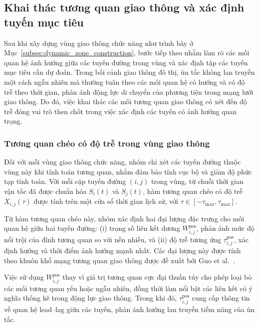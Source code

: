 \subsection{Khai thác tương quan giao thông và xác định tuyến mục tiêu}
\label{subsec:correlation_target_selection}

Sau khi xây dựng vùng giao thông chức năng như trình bày ở Mục~\ref{subsec:dynamic_zone_construction},
bước tiếp theo nhằm làm rõ các mối quan hệ ảnh hưởng giữa các tuyến đường trong vùng và xác định
tập các tuyến mục tiêu cần dự đoán. Trong bối cảnh giao thông đô thị, ùn tắc không lan truyền
một cách ngẫu nhiên mà thường tuân theo các mối quan hệ có hướng và có độ trễ theo thời gian,
phản ánh động lực di chuyển của phương tiện trong mạng lưới giao thông. Do đó, việc khai thác
các mối tương quan giao thông có xét đến độ trễ đóng vai trò then chốt trong việc xác định
các tuyến có ảnh hưởng quan trọng.

\subsubsection{Tương quan chéo có độ trễ trong vùng giao thông}
\label{subsubsec:zone_correlation}

Đối với mỗi vùng giao thông chức năng, nhóm chỉ xét các tuyến đường thuộc vùng này khi
tính toán tương quan, nhằm đảm bảo tính cục bộ và giảm độ phức tạp tính toán. Với mỗi cặp
tuyến đường $(i,j)$ trong vùng, từ chuỗi thời gian vận tốc đã được chuẩn hóa $S_i(t)$ và
$S_j(t)$, hàm tương quan chéo có độ trễ $X_{i,j}(\tau)$ được tính trên một cửa sổ thời gian
lịch sử, với $\tau \in [-\tau_{\max}, \tau_{\max}]$.

Từ hàm tương quan chéo này, nhóm xác định hai đại lượng đặc trưng cho mối quan hệ giữa
hai tuyến đường: (i) trọng số liên kết dương $W^{\text{pos}}_{i,j}$, phản ánh mức độ nổi trội
của đỉnh tương quan so với nền nhiễu, và (ii) độ trễ tương ứng $\tau^{\text{pos}}_{i,j}$,
xác định hướng và thời điểm ảnh hưởng mạnh nhất. Các đại lượng này được tính theo khuôn khổ
mạng tương quan giao thông được đề xuất bởi Guo et al.~\cite{guo2019identifying}.

Việc sử dụng $W^{\text{pos}}_{i,j}$ thay vì giá trị tương quan cực đại thuần túy cho phép
loại bỏ các mối tương quan yếu hoặc ngẫu nhiên, đồng thời làm nổi bật các liên kết có ý nghĩa
thống kê trong động lực giao thông. Trong khi đó, $\tau^{\text{pos}}_{i,j}$ cung cấp thông
tin về quan hệ lead--lag giữa các tuyến, phản ánh hướng lan truyền tiềm năng của ùn tắc.

